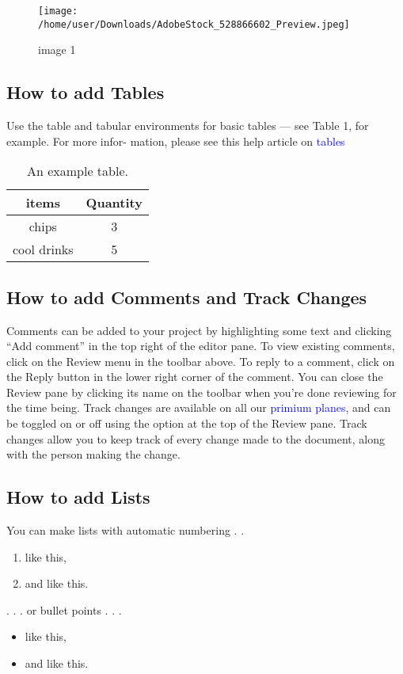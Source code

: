 \documentclass{article}
\begin{document}
	\begin{figure}[h]
		\centering
		\texttt{[image: /home/user/Downloads/AdobeStock\_528866602\_Preview.jpeg]}
		\caption{image 1}
	\end{figure}

	\subsection{How to add Tables}
	Use the table and tabular environments for basic tables — see Table 1, for example. For more infor-
	mation, please see this help article on \textcolor{blue}{tables}
	
	\begin{table}[h]
		\centering
		\begin{tabular}{|c|c|}
			\hline
			\textbf{items}& \textbf{Quantity}\\
			\hline
			chips & 3\\
			\hline
			cool drinks & 5\\
			\hline
		\end{tabular}
		\caption{An example table.}
	\end{table}
	
	
	
	\subsection{How to add Comments and Track Changes}
	Comments can be added to your project by highlighting some text and clicking “Add comment” in
	the top right of the editor pane. To view existing comments, click on the Review menu in the toolbar
	above. To reply to a comment, click on the Reply button in the lower right corner of the comment.
	You can close the Review pane by clicking its name on the toolbar when you’re done reviewing for the
	time being.
	Track changes are available on all our \textcolor{blue}{primium planes}, and can be toggled on or off using the option
	at the top of the Review pane. Track changes allow you to keep track of every change made to the
	document, along with the person making the change.
	\subsection{How to add Lists}
	You can make lists with automatic numbering . . 
	\begin{enumerate}
		\item like this,
		\item and like this.
	\end{enumerate}
	. . . or bullet points . . .
	\begin{itemize}
		\item like this,
		\item and like this.
	\end{itemize}
	
\end{document}
